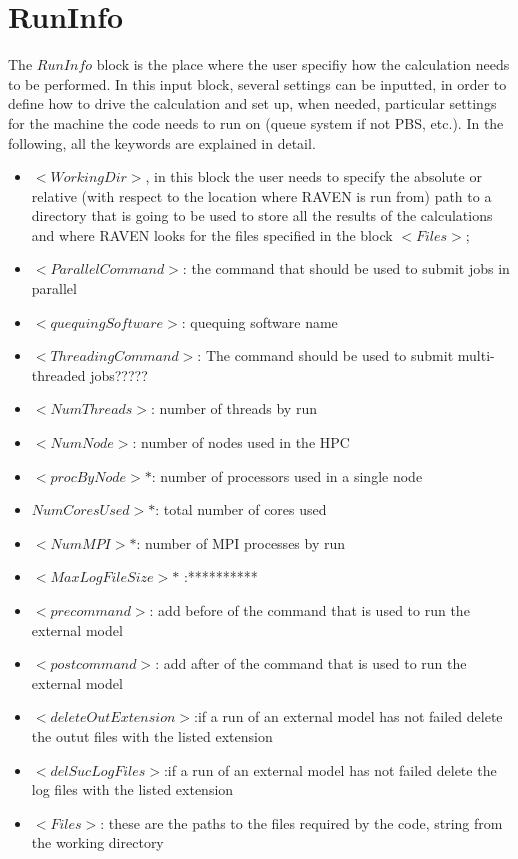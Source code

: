 \section{RunInfo  \\ \vspace{2 mm} {\small }}
The $RunInfo$ block is the place where the user specifiy how the calculation needs to be performed. In this input block, several settings can be inputted, in order to define how to drive the calculation and set up, when needed, particular settings for the machine the code needs to run on (queue system if not PBS, etc.).
In the following, all the keywords are explained in detail.
\begin{itemize}
\item $<WorkingDir>$, in this block the user needs to specify the absolute or relative (with respect to the location where RAVEN is run from) path to a directory that is going to be used to store all the results of the calculations and where RAVEN looks for the files specified in the block $<Files>$;
\item $<ParallelCommand>$: the command that should be used to submit jobs in parallel
\item $<quequingSoftware>$: quequing software name
\item $<ThreadingCommand>$: The command should be used to submit multi-threaded jobs?????
\item $<NumThreads>$: number of threads by run
\item $<NumNode>$: number of nodes used in the HPC 
\item $<procByNode>*$: number of processors used in a single node 
\item $NumCoresUsed>*$: total number of cores used
\item $<NumMPI>*$: number of MPI processes by run
\item $<MaxLogFileSize>*$ :**********
\item $<precommand>$: add before of the command that is used to run the external model
\item $<postcommand>$: add after of the command that is used to run the external model
\item $<deleteOutExtension>$:if a run of an external model has not failed delete the outut files with the listed extension
\item $<delSucLogFiles>$:if a run of an external model has not failed delete the log files with the listed extension
\item $<Files>$: these are the paths to the files required by the code, string from the working directory 

\end{itemize}
